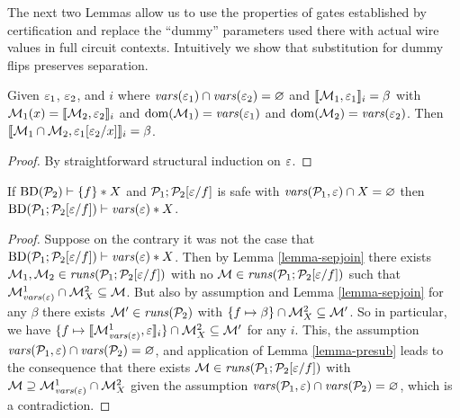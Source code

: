 The next two Lemmas allow us to use the properties of gates established by
certification and replace the ``dummy'' parameters used there with actual
wire values in full circuit contexts. Intuitively we show that substitution
for dummy flips preserves separation.
\begin{lemma}
  \label{lemma-presub}
  Given $\varepsilon_1$, $\varepsilon_2$, and $i$ where $\mathit{vars}(\varepsilon_1) \cap
  \mathit{vars}(\varepsilon_2) = \varnothing$ and $\llbracket \mathcal{M}_1,\varepsilon_1 \rrbracket_{i} = \beta$
  with $\mathcal{M}_1(x) = \llbracket \mathcal{M}_2,\varepsilon_2 \rrbracket_{i}$ and
  $\mathrm{dom}(\mathcal{M}_1) = \mathit{vars}(\varepsilon_1)$ and $\mathrm{dom}(\mathcal{M}_2) = \mathit{vars}(\varepsilon_2)$.
  Then $\llbracket \mathcal{M}_1\cap\mathcal{M}_2,\varepsilon_1[\varepsilon_2/x] \rrbracket_{i} = \beta$.
\end{lemma}
\begin{proof}
By straightforward structural induction on $\varepsilon$.
\end{proof}

\begin{lemma}[Substitution]
  \label{lemma-substitution}
  If $\mathrm{BD}(\mathcal{P}_2) \vdash \{ f \} * X$ and
  $\mathcal{P}_1;\mathcal{P}_2[\varepsilon/f]$ is safe with $\mathit{vars}(\mathcal{P}_1,\varepsilon) \cap
  X = \varnothing$ then
  $\mathrm{BD}(\mathcal{P}_1;\mathcal{P}_2[\varepsilon/f]) \vdash \mathit{vars}(\varepsilon) * X$.
\end{lemma}
\begin{proof}
  Suppose on the contrary it was not the case that
  $\mathrm{BD}(\mathcal{P}_1;\mathcal{P}_2[\varepsilon/f]) \vdash \mathit{vars}(\varepsilon) * X$.
  Then by Lemma \ref{lemma-sepjoin} there exists $\mathcal{M}_1,\mathcal{M}_2
  \in \mathit{runs}(\mathcal{P}_1;\mathcal{P}_2[\varepsilon/f])$ with no $\mathcal{M} \in
  \mathit{runs}(\mathcal{P}_1;\mathcal{P}_2[\varepsilon/f])$ such that $\mathcal{M}^1_{\mathit{vars}(\varepsilon)}
  \cap \mathcal{M}^2_X \subseteq \mathcal{M}$.  But also by
  assumption and Lemma \ref{lemma-sepjoin} for any $\beta$ there
  exists $\mathcal{M}' \in \mathit{runs}(\mathcal{P}_2)$ with $\{ f \mapsto \beta \} \cap
  \mathcal{M}^2_X \subseteq \mathcal{M}'$. So in particular, we
  have $\{ f \mapsto \llbracket \mathcal{M}^1_{\mathit{vars}(\varepsilon)},\varepsilon \rrbracket_{i} \} \cap
  \mathcal{M}^2_X \subseteq \mathcal{M}'$ for any $i$. This, the
  assumption $\mathit{vars}(\mathcal{P}_1,\varepsilon) \cap \mathit{vars}(\mathcal{P}_2) = \varnothing$,
  and application of Lemma \ref{lemma-presub} leads to the consequence
  that there exists $\mathcal{M} \in \mathit{runs}(\mathcal{P}_1;\mathcal{P}_2[\varepsilon/f])$ with
  $\mathcal{M} \supseteq \mathcal{M}^1_{\mathit{vars}(\varepsilon)} \cap
  \mathcal{M}^2_X$ given the assumption $\mathit{vars}(\mathcal{P}_1,\varepsilon)
  \cap \mathit{vars}(\mathcal{P}_2) = \varnothing$, which is a contradiction.
\end{proof}

